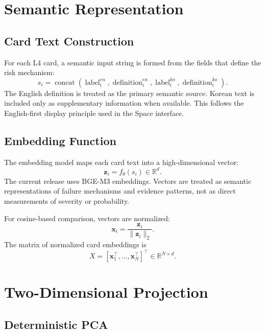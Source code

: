 \documentclass[11pt,a4paper]{article}
\begin{document}
\section{Semantic Representation}

\subsection{Card Text Construction}

For each L4 card, a semantic input string is formed from the fields that define the risk mechanism:
\begin{equation}
s_i =
\operatorname{concat}
\left(
\operatorname{label}_{i}^{en},
\operatorname{definition}_{i}^{en},
\operatorname{label}_{i}^{ko},
\operatorname{definition}_{i}^{ko}
\right).
\end{equation}
The English definition is treated as the primary semantic source. Korean text is included only as supplementary information when available. This follows the English-first display principle used in the Space interface.

\subsection{Embedding Function}

The embedding model maps each card text into a high-dimensional vector:
\begin{equation}
\mathbf{z}_i = f_{\theta}(s_i) \in \mathbb{R}^{d}.
\end{equation}
The current release uses BGE-M3 embeddings. Vectors are treated as semantic representations of failure mechanisms and evidence patterns, not as direct measurements of severity or probability.

For cosine-based comparison, vectors are normalized:
\begin{equation}
\mathbf{x}_i = \frac{\mathbf{z}_i}{\|\mathbf{z}_i\|_2}.
\end{equation}
The matrix of normalized card embeddings is
\begin{equation}
X = [\mathbf{x}_1^\top,\ldots,\mathbf{x}_N^\top]^\top \in \mathbb{R}^{N \times d}.
\end{equation}

\section{Two-Dimensional Projection}

\subsection{Deterministic PCA}
\end{document}
